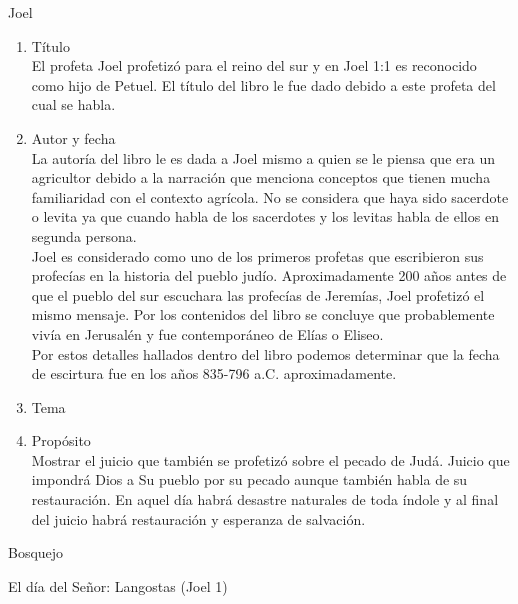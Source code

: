 \documentclass[12pt]{article}
\begin{document}
\begin{section}{Joel}
	\begin{enumerate}
		\item Título\\
			El profeta Joel profetizó para el reino del sur y en Joel 1:1 es reconocido como hijo de Petuel. El título del libro le fue dado debido a este profeta del cual se habla.
		\item Autor y fecha\\
			La autoría del libro le es dada a Joel mismo a quien se le piensa que era un agricultor debido a la narración que menciona conceptos que tienen mucha familiaridad con el contexto agrícola. No se considera que haya sido sacerdote o levita ya que cuando habla de los sacerdotes y los levitas habla de ellos en segunda persona.\\
			Joel es considerado como uno de los primeros profetas que escribieron sus profecías en la historia del pueblo judío. Aproximadamente 200 años antes de que el pueblo del sur escuchara las profecías de Jeremías, Joel profetizó el mismo mensaje. Por los contenidos del libro se concluye que probablemente vivía en Jerusalén y fue contemporáneo de Elías o Eliseo.\\
			Por estos detalles hallados dentro del libro podemos determinar que la fecha de escirtura fue en los años 835-796 a.C. aproximadamente.
		\item Tema\\
		\item Propósito\\
			Mostrar el juicio que también se profetizó sobre el pecado de Judá. Juicio que impondrá Dios a Su pueblo por su pecado aunque también habla de su restauración. En aquel día habrá desastre naturales de toda índole y al final del juicio habrá restauración y esperanza de salvación.
	\end{enumerate}
	\begin{subsection}{Bosquejo}
		\begin{subsubsection}{El día del Señor: Langostas (Joel 1)}

\end{subsubsection}
\end{subsection}
\end{section}
\end{document}
